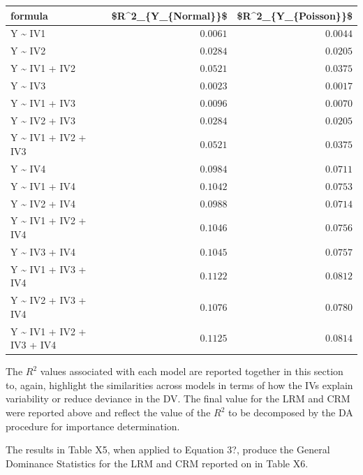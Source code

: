 \documentclass[ShortAfour,times,sageapa]{sagej}
\begin{document}
	\begin{longtable}{lrr}
		\toprule
		formula & \$R\textasciicircum{}2\_\{Y\_\{Normal\}\}\$ & \$R\textasciicircum{}2\_\{Y\_\{Poisson\}\}\$ \\ 
		\midrule
		Y \textasciitilde{} IV1 & $0.0061$ & $0.0044$ \\ 
		Y \textasciitilde{} IV2 & $0.0284$ & $0.0205$ \\ 
		Y \textasciitilde{} IV1 + IV2 & $0.0521$ & $0.0375$ \\ 
		Y \textasciitilde{} IV3 & $0.0023$ & $0.0017$ \\ 
		Y \textasciitilde{} IV1 + IV3 & $0.0096$ & $0.0070$ \\ 
		Y \textasciitilde{} IV2 + IV3 & $0.0284$ & $0.0205$ \\ 
		Y \textasciitilde{} IV1 + IV2 + IV3 & $0.0521$ & $0.0375$ \\ 
		Y \textasciitilde{} IV4 & $0.0984$ & $0.0711$ \\ 
		Y \textasciitilde{} IV1 + IV4 & $0.1042$ & $0.0753$ \\ 
		Y \textasciitilde{} IV2 + IV4 & $0.0988$ & $0.0714$ \\ 
		Y \textasciitilde{} IV1 + IV2 + IV4 & $0.1046$ & $0.0756$ \\ 
		Y \textasciitilde{} IV3 + IV4 & $0.1045$ & $0.0757$ \\ 
		Y \textasciitilde{} IV1 + IV3 + IV4 & $0.1122$ & $0.0812$ \\ 
		Y \textasciitilde{} IV2 + IV3 + IV4 & $0.1076$ & $0.0780$ \\ 
		Y \textasciitilde{} IV1 + IV2 + IV3 + IV4 & $0.1125$ & $0.0814$ \\ 
		\bottomrule
	\end{longtable}

	The $R^2$ values associated with each model are reported together in this section to, again, highlight the similarities across models in terms of how the IVs explain variability or reduce deviance in the DV.
	The final value for the LRM and CRM were reported above and reflect the value of the $R^2$ to be decomposed by the DA procedure for importance determination.
	
	The results in Table X5, when applied to Equation 3?, produce the General Dominance Statistics for the LRM and CRM reported on in Table X6.
	
\end{document}
